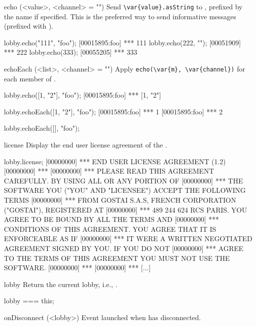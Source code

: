 \begin{urbiscriptapi}
\item[echo](<value>, <channel> = "")%
  Send \lstinline|\var{value}.asString| to \this, prefixed
  by the   name if specified.  This is
  the preferred way to send informative messages (prefixed with
  \samp{***}).
\begin{urbiscript}
lobby.echo("111", "foo");
[00015895:foo] *** 111
lobby.echo(222, "");
[00051909] *** 222
lobby.echo(333);
[00055205] *** 333
\end{urbiscript}

\item[echoEach](<list>, <channel> = "")%
  Apply \lstinline|echo(\var{m}, \var{channel})| for each member  of
  .
\begin{urbiscript}
lobby.echo([1, "2"], "foo");
[00015895:foo] *** [1, "2"]

lobby.echoEach([1, "2"], "foo");
[00015895:foo] *** 1
[00015895:foo] *** 2

lobby.echoEach([], "foo");
\end{urbiscript}


\item[license]
  Display the end user license agreement of the \usdk.
\begin{urbiunchecked}
lobby.license;
[00000000] *** END USER LICENSE AGREEMENT (1.2)
[00000000] ***
[00000000] *** PLEASE READ THIS AGREEMENT CAREFULLY.  BY USING ALL OR ANY PORTION OF
[00000000] *** THE SOFTWARE YOU ("YOU" AND "LICENSEE") ACCEPT THE FOLLOWING TERMS
[00000000] *** FROM GOSTAI S.A.S, FRENCH CORPORATION ("GOSTAI"), REGISTERED AT
[00000000] *** 489 244 624 RCS PARIS.  YOU AGREE TO BE BOUND BY ALL THE TERMS AND
[00000000] *** CONDITIONS OF THIS AGREEMENT.  YOU AGREE THAT IT IS ENFORCEABLE AS IF
[00000000] *** IT WERE A WRITTEN NEGOTIATED AGREEMENT SIGNED BY YOU.  IF YOU DO NOT
[00000000] *** AGREE TO THE TERMS OF THIS AGREEMENT YOU MUST NOT USE THE SOFTWARE.
[00000000] ***
[00000000] *** [...]
\end{urbiunchecked}

\item[lobby]
  Return the current lobby, i.e., \this.
\begin{urbiassert}
lobby === this;
\end{urbiassert}

\item[onDisconnect](<lobby>)%
  Event launched when \this has disconnected.


\end{urbiscriptapi}
